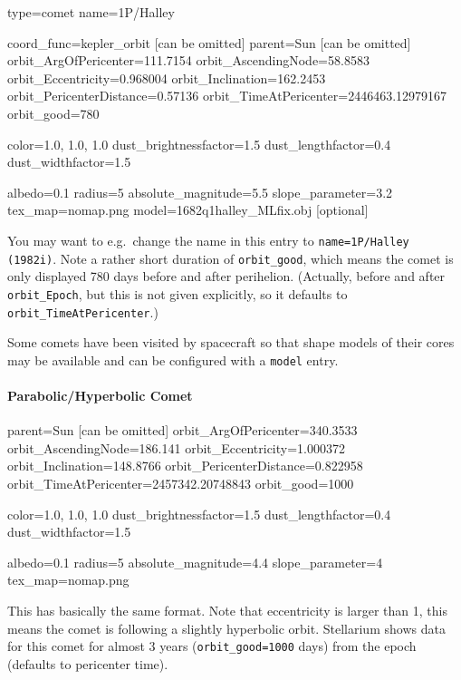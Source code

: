 \begin{configfile}
[1phalley]
type=comet  
name=1P/Halley

coord_func=kepler_orbit [can be omitted]
parent=Sun [can be omitted]
orbit_ArgOfPericenter=111.7154
orbit_AscendingNode=58.8583
orbit_Eccentricity=0.968004
orbit_Inclination=162.2453
orbit_PericenterDistance=0.57136
orbit_TimeAtPericenter=2446463.12979167
orbit_good=780

color=1.0, 1.0, 1.0
dust_brightnessfactor=1.5
dust_lengthfactor=0.4
dust_widthfactor=1.5

albedo=0.1
radius=5
absolute_magnitude=5.5
slope_parameter=3.2
tex_map=nomap.png
model=1682q1halley_MLfix.obj [optional]
\end{configfile}

You may want to e.g.\ change the name in this entry to
\texttt{name=1P/Halley (1982i)}. Note a rather short duration of
\texttt{orbit\_good}, which means the comet is only displayed 780 days
before and after perihelion. (Actually, before and after
\texttt{orbit\_Epoch}, but this is not given explicitly, so it
defaults to \texttt{orbit\_TimeAtPericenter}.)

Some comets have been visited by spacecraft so that shape models of their cores 
may be available and can be configured with a \texttt{model} entry.

\paragraph{Parabolic/Hyperbolic Comet}
\label{sec:ssystem.ini:Comet:Parabolic}

\begin{configfile}
parent=Sun [can be omitted]
orbit_ArgOfPericenter=340.3533
orbit_AscendingNode=186.141
orbit_Eccentricity=1.000372
orbit_Inclination=148.8766
orbit_PericenterDistance=0.822958
orbit_TimeAtPericenter=2457342.20748843
orbit_good=1000

color=1.0, 1.0, 1.0
dust_brightnessfactor=1.5
dust_lengthfactor=0.4
dust_widthfactor=1.5

albedo=0.1
radius=5
absolute_magnitude=4.4
slope_parameter=4
tex_map=nomap.png
\end{configfile}

This has basically the same format. Note that eccentricity is larger than 1,
this means the comet is following a slightly hyperbolic
orbit. Stellarium shows data for this comet for almost 3 years
(\texttt{orbit\_good=1000} days) from the epoch (defaults to pericenter time).





